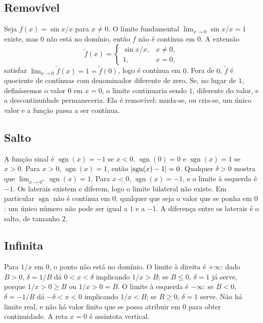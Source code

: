 \documentclass[11pt,a4paper]{article}
\begin{document}
\subsection{Remov\'ivel}

Seja $f(x)=\sin x/x$ para $x\neq 0$. O limite fundamental $\lim_{x\to 0}\sin x/x=1$ existe, mas $0$ n\~ao est\'a no dom\'inio, ent\~ao $f$ n\~ao \'e cont\'inua em $0$. A extens\~ao
\[
\tilde f(x)=\begin{cases}
\sin x/x, & x\neq 0,\\
1, & x=0,
\end{cases}
\]
satisfaz $\lim_{x\to 0}\tilde f(x)=1=\tilde f(0)$, logo \'e cont\'inua em $0$. Fora de $0$, $\tilde f$ \'e quociente de cont\'inuas com denominador diferente de zero. Se, no lugar de $1$, defin\'issemos o valor $0$ em $x=0$, o limite continuaria sendo $1$, diferente do valor, e a descontinuidade permaneceria. Ela \'e remov\'ivel: muda-se, ou cria-se, um \'unico valor e a fun\c{c}\~ao passa a ser cont\'inua.

\subsection{Salto}

A fun\c{c}\~ao sinal \'e $\operatorname{sgn}(x)=-1$ se $x<0$, $\operatorname{sgn}(0)=0$ e $\operatorname{sgn}(x)=1$ se $x>0$. Para $x>0$, $\operatorname{sgn}(x)=1$, ent\~ao $\left\lvert \operatorname{sgn}(x)-1 \right\rvert=0$. Qualquer $\delta>0$ mostra que $\lim_{x\to 0^+}\operatorname{sgn}(x)=1$. Para $x<0$, $\operatorname{sgn}(x)=-1$, e o limite \`a esquerda \'e $-1$. Os laterais existem e diferem, logo o limite bilateral n\~ao existe. Em particular $\operatorname{sgn}$ n\~ao \'e cont\'inua em $0$, qualquer que seja o valor que se ponha em $0$: um \'unico n\'umero n\~ao pode ser igual a $1$ e a $-1$. A diferen\c{c}a entre os laterais \'e o salto, de tamanho $2$.

\subsection{Infinita}

Para $1/x$ em $0$, o ponto n\~ao est\'a no dom\'inio. O limite \`a direita \'e $+\infty$: dado $B>0$, $\delta=1/B$ d\'a $0<x<\delta$ implicando $1/x>B$; se $B\le 0$, $\delta=1$ j\'a serve, porque $1/x>0\ge B$ ou $1/x>0=B$. O limite \`a esquerda \'e $-\infty$: se $B<0$, $\delta=-1/B$ d\'a $-\delta<x<0$ implicando $1/x<B$; se $B\ge 0$, $\delta=1$ serve. N\~ao h\'a limite real, e n\~ao h\'a valor finito que se possa atribuir em $0$ para obter continuidade. A reta $x=0$ \'e ass\'intota vertical.
\end{document}
